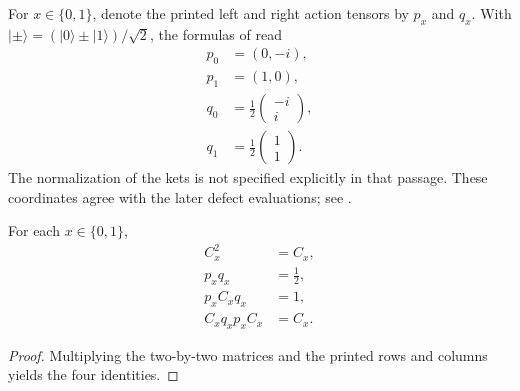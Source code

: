 \begin{definition}
    \label{def:mpug_czx_printed_action_pair}
    \leanok
    For $x\in\{0,1\}$, denote the printed left and right action tensors
    by $p_x$ and $q_x$. With $|\pm\rangle=(|0\rangle\pm|1\rangle)/\sqrt2$,
    the formulas of \cite[lines~4690--4694]{FrancoRubio2025MPUGauging} read
    \begin{align}
        p_0 & =(0,-i),                                    \\
        p_1 & =(1,0),                                     \\
        q_0 & =\tfrac12\begin{pmatrix}-i\\i\end{pmatrix}, \\
        q_1 & =\tfrac12\begin{pmatrix}1\\1\end{pmatrix}.
        \label{eq:mpug_czx_printed_action_pair}
    \end{align}
    The normalization of the kets is not specified explicitly in that
    passage. These coordinates agree with the later defect evaluations;
    see \cite{gap:fbc25_czx_action_empty_word}.
\end{definition}

\begin{lemma}
    \label{thm:mpug_czx_printed_action_contractions}
    \leanok
    For each $x\in\{0,1\}$,
    \begin{align}
        C_x^2        & =C_x,      \\
        p_xq_x       & =\tfrac12, \\
        p_xC_xq_x    & =1,        \\
        C_xq_xp_xC_x & =C_x.
        \label{eq:mpug_czx_printed_action_contractions}
    \end{align}
\end{lemma}
\begin{proof}\leanok
    Multiplying the two-by-two matrices and the printed rows and columns
    yields the four identities.
\end{proof}

